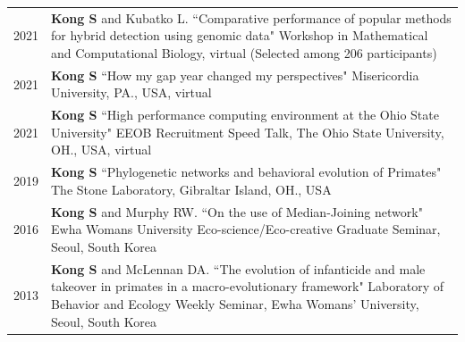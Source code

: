 \documentclass[11pt]{article}
\begin{document}
\begin{longtable}{p{}  p{}}
2021 & \textbf{Kong S} and Kubatko L.  ``Comparative performance of popular methods for hybrid detection using genomic data" Workshop in Mathematical and Computational Biology, virtual (Selected among 206 participants)\textit{}  \\ 

2021 & \textbf{Kong S} ``How my gap year changed my perspectives" Misericordia University, PA., USA, virtual \vspace{5pt} \\  

2021 & \textbf{Kong S} ``High performance computing environment at the Ohio State University" EEOB Recruitment Speed Talk, The Ohio State University, OH., USA, virtual \vspace{5pt} \\ 

2019 &  \textbf{Kong S} ``Phylogenetic networks and behavioral evolution of Primates" The Stone Laboratory, Gibraltar Island, OH., USA \vspace{5pt} \\ 

2016 & \textbf{Kong S} and Murphy RW. ``On the use of Median-Joining network" Ewha Womans University Eco-science/Eco-creative Graduate Seminar, Seoul, South Korea \vspace{5pt} \\

2013 & \textbf{Kong S} and McLennan DA. ``The evolution of infanticide and male takeover in primates in a macro-evolutionary framework" Laboratory of Behavior and Ecology Weekly Seminar, Ewha Womans’ University, Seoul, South Korea \vspace{5pt} \\ 
\end{longtable}
\end{document}
